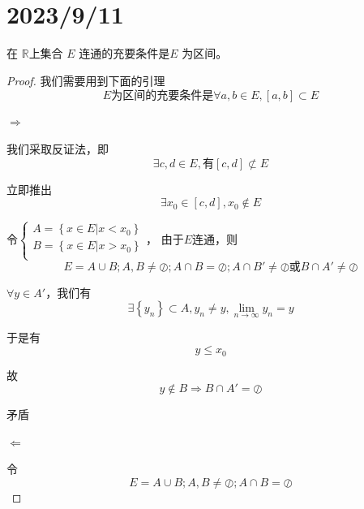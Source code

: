 \documentclass[lang=cn,10pt]{elegantbook}
\begin{document}
\section{2023/9/11}
\begin{theorem}
	在  $\mathbb{R}$上集合 $E$ 连通的充要条件是$ E$ 为区间。
\end{theorem}
\begin{proof}
	
	我们需要用到下面的引理
	\begin{equation*}
		E\text{为区间的充要条件是}\forall a,b\in E,\left[ a,b \right] \subset E
	\end{equation*}
	
	$\Rightarrow$

	我们采取反证法，即
	\begin{equation*}
		\exists c,d \in E,\text{有}[c,d]\nsubset E
	\end{equation*}
	
	立即推出
	\begin{equation*}
		\exists x_{0} \in [c,d] ,x_{0}\notin E 
	\end{equation*}
	
	令$\begin{cases}
		A=\left\{ x\in E|x<x_0 \right\}\\
		B=\left\{ x\in E|x>x_0 \right\}\\
	\end{cases}$，
	由于$E$连通，则
	\begin{equation*}
		E=A\cup B;A,B\ne \oslash ;A\cap B=\oslash ;A\cap B'\ne\oslash\text{或}B\cap A'\ne\oslash
	\end{equation*}
	
	$\forall y \in A' $，我们有
	\begin{equation*}
		\exists \left\{ y_n \right\} \subset A,y_n\ne y,\lim_{n\rightarrow \infty} y_n=y
	\end{equation*}
	
	于是有
	\begin{equation*}
		y\le x_{0}
	\end{equation*}
	
	故
	\begin{equation*}
		y\notin B\Rightarrow B\cap A'=\oslash
	\end{equation*}
	
	矛盾
	
	$\Leftarrow$
	
	令\begin{equation*}
		E=A\cup B;A,B\ne \oslash ;A\cap B=\oslash 
	\end{equation*}
	

\end{proof}
\end{document}
